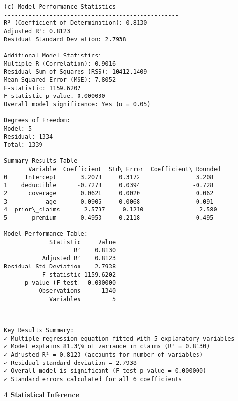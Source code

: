 \documentclass[8pt, twocolumn]{extarticle}
\begin{document}
    \begin{Verbatim}[commandchars=\\\{\}]
(c) Model Performance Statistics
--------------------------------------------------
R² (Coefficient of Determination): 0.8130
Adjusted R²: 0.8123
Residual Standard Deviation: 2.7938

Additional Model Statistics:
Multiple R (Correlation): 0.9016
Residual Sum of Squares (RSS): 10412.1409
Mean Squared Error (MSE): 7.8052
F-statistic: 1159.6202
F-statistic p-value: 0.000000
Overall model significance: Yes (α = 0.05)

Degrees of Freedom:
Model: 5
Residual: 1334
Total: 1339

Summary Results Table:
       Variable  Coefficient  Std\_Error  Coefficient\_Rounded
0     Intercept       3.2078     0.3172                3.208
1    deductible      -0.7278     0.0394               -0.728
2      coverage       0.0621     0.0020                0.062
3           age       0.0906     0.0068                0.091
4  prior\_claims       2.5797     0.1210                2.580
5       premium       0.4953     0.2118                0.495

Model Performance Table:
             Statistic     Value
                    R²    0.8130
           Adjusted R²    0.8123
Residual Std Deviation    2.7938
           F-statistic 1159.6202
      p-value (F-test)  0.000000
          Observations      1340
             Variables         5
    \end{Verbatim}
    \begin{center}
    \end{center}
    { \hspace*{\fill} \\}
    \begin{Verbatim}[commandchars=\\\{\}]
Key Results Summary:
✓ Multiple regression equation fitted with 5 explanatory variables
✓ Model explains 81.3\% of variance in claims (R² = 0.8130)
✓ Adjusted R² = 0.8123 (accounts for number of variables)
✓ Residual standard deviation = 2.7938
✓ Overall model is significant (F-test p-value = 0.000000)
✓ Standard errors calculated for all 6 coefficients
    \end{Verbatim}
    \textbf{4 Statistical Inference}
\end{document}
